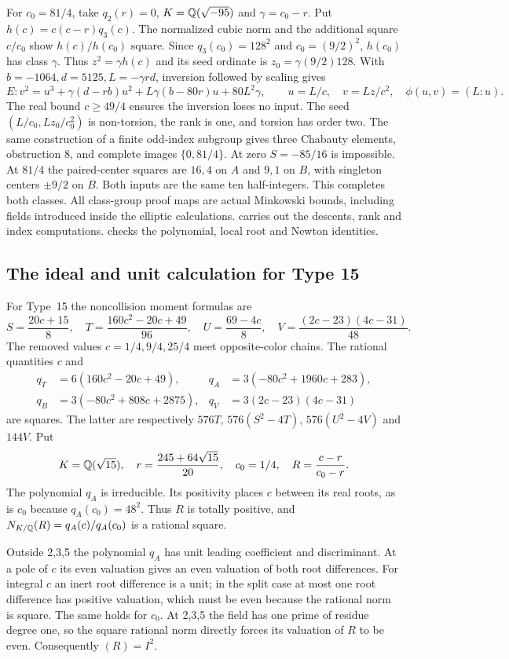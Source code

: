 For $c_0=81/4$, take $q_2(r)=0$, $K=\mathbb Q(\sqrt{-95})$ and
$\gamma=c_0-r$. Put $h(c)=c(c-r)q_3(c)$. The normalized cubic
norm and the additional square $c/c_0$ show $h(c)/h(c_0)$ square.
Since $q_3(c_0)=128^2$ and $c_0=(9/2)^2$, $h(c_0)$ has class
$\gamma$. Thus $z^2=\gamma h(c)$ and its seed ordinate is
$z_0=\gamma(9/2)128$. With $b=-1064,d=5125,L=-\gamma rd$,
inversion followed by scaling gives
\[
 E:v^2=u^3+\gamma(d-rb)u^2+L\gamma(b-80r)u+80L^2\gamma,
 \qquad u=L/c,\quad v=Lz/c^2,\quad\phi(u,v)=(L:u).
\]
The real bound $c\geq49/4$ ensures the inversion loses no input.
The seed $(L/c_0,Lz_0/c_0^2)$ is non-torsion, the rank is one,
and torsion has order two. The same construction of a finite odd-index
subgroup gives three Chabauty elements, obstruction 8, and complete
images $\{0,81/4\}$. At zero $S=-85/16$ is impossible. At $81/4$
the paired-center squares are $16,4$ on $A$ and $9,1$ on $B$,
with singleton centers $\pm9/2$ on $B$. Both inputs are the same ten
half-integers. This completes both classes.
All class-group proof maps are actual Minkowski bounds, including
fields introduced inside the elliptic calculations.
 carries out the descents, rank and
index computations. 
checks the polynomial, local root and Newton identities.

\subsection{The ideal and unit calculation for Type 15}\label{detail:type15}
For Type~15 the noncollision moment formulas are
\[
 S=\frac{20c+15}{8},\quad T=\frac{160c^2-20c+49}{96},
 \quad U=\frac{69-4c}{8},\quad V=\frac{(2c-23)(4c-31)}{48}.
\]
The removed values $c=1/4,9/4,25/4$ meet opposite-color chains.
The rational quantities $c$ and
\[
\begin{aligned}
 q_T&=6(160c^2-20c+49),&q_A&=3(-80c^2+1960c+283),\\
 q_B&=3(-80c^2+808c+2875),&q_V&=3(2c-23)(4c-31)
\end{aligned}
\]
are squares. The latter are respectively $576T$, $576(S^2-4T)$,
$576(U^2-4V)$ and $144V$.
Put
\[
 K=\mathbb Q(\sqrt{15}),\quad r=\frac{245+64\sqrt{15}}{20},
 \quad c_0=1/4,\quad R=\frac{c-r}{c_0-r}.
\]
The polynomial $q_A$ is irreducible. Its positivity places $c$ between
its real roots, as is $c_0$ because $q_A(c_0)=48^2$.
Thus $R$ is totally positive, and
$N_{K/\mathbb Q}(R)=q_A(c)/q_A(c_0)$ is a rational square.

Outside 2,3,5 the polynomial $q_A$ has unit leading coefficient and
discriminant. At a pole of $c$ its even valuation gives an even
valuation of both root differences. For integral $c$ an inert root
difference is a unit; in the split case at most one root difference
has positive valuation, which must be even because the rational norm
is square. The same holds for $c_0$. At 2,3,5 the field has one
prime of residue degree one, so the square rational norm directly
forces its valuation of $R$ to be even. Consequently $(R)=I^2$.

